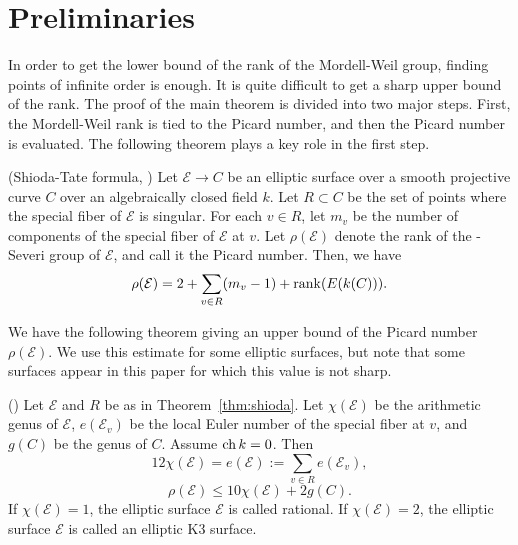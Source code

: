 \documentclass[main]{subfiles}
\begin{document}
\section{Preliminaries}

In order to get the lower bound of the rank of the Mordell-Weil group, finding points of infinite order is enough.
It is quite difficult to get a sharp upper bound of the rank.
The proof of the main theorem is divided into two major steps.
First, the Mordell-Weil rank is tied to the Picard number, and then the Picard number is evaluated.
The following theorem plays a key role in the first step.
\begin{thm}{(Shioda-Tate formula, \cite[Corollary 5.3]{ref:shioda1990})}
    \label{thm:shioda}
    Let $\mathcal{E} \to C$ be an elliptic surface over a smooth projective curve $C$ over an algebraically closed field $k$.
    Let $R \subset C$ be the set of points where the special fiber of $\mathcal{E}$ is singular.
    For each $v \in R$, let $m_{v}$ be the number of components of the special fiber of $\mathcal{E}$ at $v$.
    Let $\rho(\mathcal{E})$ denote the rank of the \Neron-Severi group of $\mathcal{E}$, and call it the Picard number.
    Then, we have
    \begin{equation*}
        \rho (\mathcal{E}) = 2 + \sum_{v \in R} (m_{v} - 1) + \operatorname{rank}(E(k(C))).
    \end{equation*}
\end{thm}

We have the following theorem giving an upper bound of the Picard number $\rho(\mathcal{E})$.
We use this estimate for some elliptic surfaces, but note that some surfaces appear in this paper for which this value is not sharp.
\begin{thm}{(\cite[Twierdzenie 2.2.9, 2.2.10, 2.2.19]{ref:naskreckiphd})}
    Let $\mathcal{E}$ and $R$ be as in Theorem~\ref{thm:shioda}.
    Let $\chi(\mathcal{E})$ be the arithmetic genus of $\mathcal{E}$, $e(\mathcal{E}_v)$ be the local Euler number of the special fiber at $v$, and $g(C)$ be the genus of $C$. \label{thm:rho}
    Assume $\operatorname{ch} k = 0$.
    Then
    \begin{equation*}
        12 \chi(\mathcal{E}) = e(\mathcal{E}) := \sum_{v \in R} e(\mathcal{E}_{v}),
    \end{equation*}
    \begin{equation*}
        \rho(\mathcal{E}) \leq 10 \chi(\mathcal{E}) + 2g(C).
    \end{equation*}
    If $\chi(\mathcal{E}) = 1$, the elliptic surface $\mathcal{E}$ is called rational.
    If $\chi(\mathcal{E}) = 2$, the elliptic surface $\mathcal{E}$ is called an elliptic K3 surface.
\end{thm}
\end{document}

